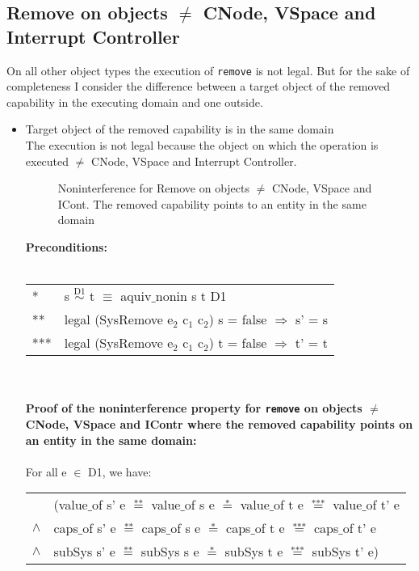 \subsection{Remove on objects $\neq$ CNode, VSpace and Interrupt Controller} 
On all other object types the execution of \texttt{remove} is not legal. But for the sake of completeness I consider the difference between a target object of the removed capability in the executing domain and one outside.
\begin{itemize}
\item Target object of the removed capability is in the same domain \\
The execution is not legal because the object on which the operation is executed $\neq$ CNode, VSpace and Interrupt Controller.
\begin{figure}[H]
\caption{Noninterference for Remove on objects $\neq$ CNode, VSpace and ICont. The removed capability points to an entity in the same domain}
\label{fig:RemoveOthers}
\end{figure}
\textbf{Preconditions:} \\ \\
\begin{tabular}{ll}
* & s $\overset{\text{D1}}{\sim}$ t $\equiv$ aquiv$\_$nonin s t D1	\\ 
** & legal (SysRemove e$_2$ c$_1$ c$_2$) s = false $\Rightarrow$ s' = s \\ 
*** & legal (SysRemove e$_2$ c$_1$ c$_2$) t = false $\Rightarrow$ t' = t
\end{tabular} \\ \\ 
\textbf{Proof of the noninterference property for \texttt{remove} on objects $\neq$ CNode, VSpace and IContr where the removed capability points on an entity in the same domain:}\\ \\
For all e $\in$ D1, we have: \\ 
\begin{tabular}{ll}
& (value$\_$of s' e $\overset{\text{**}}{=}$ value$\_$of s e $\overset{\text{*}}{=}$ value$\_$of t e $\overset{\text{***}}{=}$ value$\_$of t' e \\
$\wedge$ & caps$\_$of s' e $\overset{\text{**}}{=}$ caps$\_$of s e $\overset{\text{*}}{=}$ caps$\_$of t e $\overset{\text{***}}{=}$ caps$\_$of t' e \\
$\wedge$ & subSys s' e $\overset{\text{**}}{=}$ subSys s e $\overset{\text{*}}{=}$ subSys t e $\overset{\text{***}}{=}$ subSys t' e)

\end{tabular}
\end{itemize}
